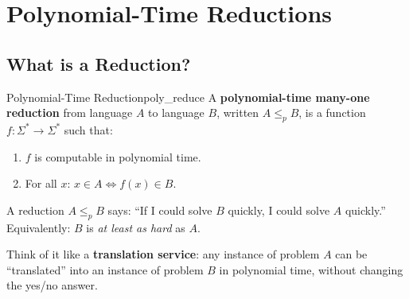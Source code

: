 \documentclass[12pt,a4paper]{article}
\newcommand{\leqp}{\leq_p}
\begin{document}
\newpage

\section{Polynomial-Time Reductions}

\subsection{What is a Reduction?}

\begin{definition}{Polynomial-Time Reduction}{poly_reduce}
A \textbf{polynomial-time many-one reduction} from language $A$ to language $B$, 
written $A \leqp B$, is a function $f: \Sigma^* \to \Sigma^*$ such that:
\begin{enumerate}[leftmargin=2em]
  \item $f$ is computable in polynomial time.
  \item For all $x$: $x \in A \iff f(x) \in B$.
\end{enumerate}
\end{definition}

\begin{intuition}
A reduction $A \leqp B$ says: ``If I could solve $B$ quickly, I could solve $A$ quickly.''
Equivalently: $B$ is \emph{at least as hard} as $A$.

\medskip
Think of it like a \textbf{translation service}: any instance of problem $A$ can be 
``translated'' into an instance of problem $B$ in polynomial time, without changing 
the yes/no answer.
\end{intuition}
\end{document}
